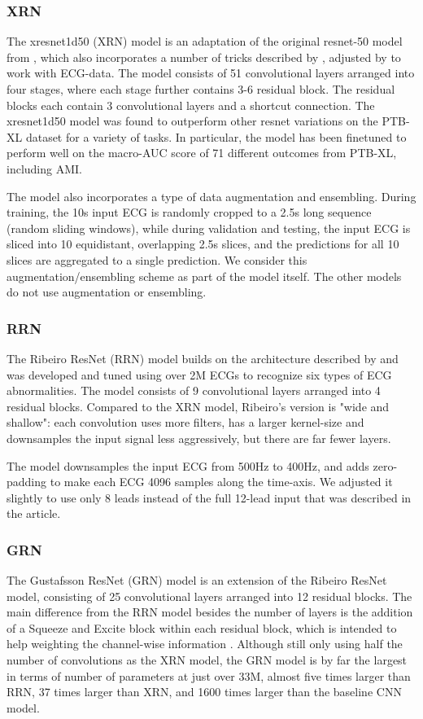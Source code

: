 \documentclass[journal,twoside,web]{ieeecolor}
\begin{document}
\subsubsection{XRN}
The xresnet1d50 (XRN) model is an adaptation of the original resnet-50 model from \cite{he2016}, which also incorporates a number of tricks described by \cite{he2019}, adjusted by \cite{strodthoff2020} to work with ECG-data. The model consists of 51 convolutional layers arranged into four stages, where each stage further contains 3-6 residual block. The residual blocks each contain 3 convolutional layers and a shortcut connection. The xresnet1d50 model was found to outperform other resnet variations on the PTB-XL dataset for a variety of tasks. In particular, the model has been finetuned to perform well on the macro-AUC score of 71 different outcomes from PTB-XL, including AMI. 

The model also incorporates a type of data augmentation and ensembling. During training, the 10s input ECG is randomly cropped to a 2.5s long sequence (random sliding windows), while during validation and testing, the input ECG is sliced into 10 equidistant, overlapping 2.5s slices, and the predictions for all 10 slices are aggregated to a single prediction. We consider this augmentation/ensembling scheme as part of the model itself. The other models do not use augmentation or ensembling.

\subsubsection{RRN}
The Ribeiro ResNet (RRN) model builds on the architecture described by \cite{hannun2019} and was developed and tuned using over 2M ECGs to recognize six types of ECG abnormalities. The model consists of 9 convolutional layers arranged into 4 residual blocks. Compared to the XRN model, Ribeiro's version is "wide and shallow": each convolution uses more filters, has a larger kernel-size and downsamples the input signal less aggressively, but there are far fewer layers. 

The model downsamples the input ECG from 500Hz to 400Hz, and adds zero-padding to make each ECG 4096 samples along the time-axis. We adjusted it slightly to use only 8 leads instead of the full 12-lead input that was described in the article. 

\subsubsection{GRN}
The Gustafsson ResNet (GRN) model is an extension of the Ribeiro ResNet model, consisting of 25 convolutional layers arranged into 12 residual blocks. The main difference from the RRN model besides the number of layers is the addition of a Squeeze and Excite block within each residual block, which is intended to help weighting the channel-wise information \cite{hu2018}. Although still only using half the number of convolutions as the XRN model, the GRN model is by far the largest in terms of number of parameters at just over 33M, almost five times larger than RRN, 37 times larger than XRN, and 1600 times larger than the baseline CNN model.
\end{document}
